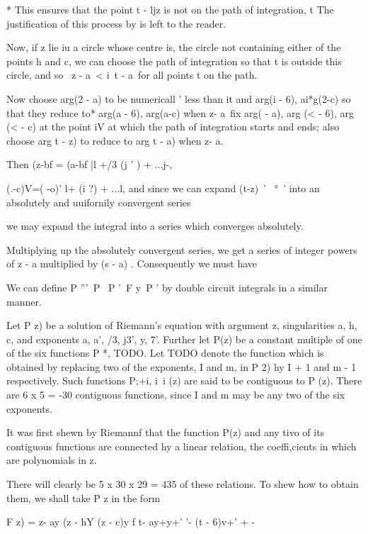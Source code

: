* This ensures that the point t - ljz is not on the path of
integration, t The justification of this process by is left to
the reader.

%
%

Now, if z lie iu a circle whose centre is, the circle not containing
either of the points h and c, we can choose the path of integration so
that t is outside this circle, and so \ z - a\ < i\ t - a\ for all
points t on the path.

Now choose arg(2 - a) to be numericall ' less than it and arg(i - 6),
ai*g(2-c) so that they reduce to* arg(a - 6), arg(a-c) when z- a\ fix
arg( - a), arg (< - 6), arg (< - c) at the point iV at which the path
of integration starts and ends; also choose arg t - z) to reduce to
arg t - a) when z- a.

Then (z-bf = (a-bf |l +/3 (j ' ) + ...j-,

(.-c)V=( -o)' l+ (i ?) + ...l, and since we can expand (t-z)~' ~°~'
into an absolutely and uuifornily convergent series

we may expand the integral into a series which converges absolutely.

Multiplying up the absolutely convergent series, we get a series of
integer powers of z - a multiplied by (s - a) . Consequently we must
have

We can define P '''\ P \ P '\ F y\ P ' by double circuit integrals in
a similar manner.


Let P z) be a solution of Riemann's equation with argument z,
singularities a, h, c, and exponents a, a', /3, j3', y, 7'. Further
let P(z) be a constant multiple of one of the six functions P *,
TODO.
Let TODO denote the function
which is obtained by replacing two of the exponents, I and m, in P 2)
hy I + 1 and m - 1 respectively. Such functions P;+i, i\ i (z) are
said to be contiguous to P (z). There are 6 x 5 = -30 contiguous
functions, since I and m may be any two of the six exponents.

It was first shewn by Riemannf that the function P(z) and any tivo of
its contiguous functions are connected hy a linear relation, the
coeffi,cients in which are polynomials in z.

There will clearly be 5 x 30 x 29 = 435 of these relations. To shew
how to obtain them, we shall take P z in the form

F z) = z- ay (z - hY (z - c)y f t- ay+y+' '- (t - 6)v+' + -

